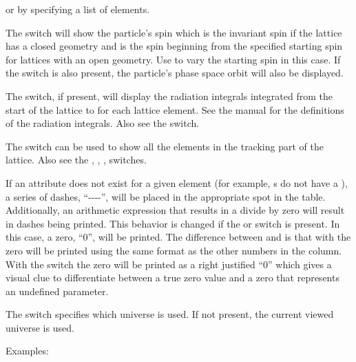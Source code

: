 {{{{{{{{\begin{description}
or by specifying a list  of elements. 
%
\item[-spin] \Newline
The  switch will show the particle's spin which is the invariant spin if the lattice has a
closed geometry and is the spin beginning from the specified starting spin for lattices with an open
geometry. Use  to vary the starting spin in this case. If the  switch
is also present, the particle's phase space orbit will also be displayed.
%
\item[-sum_radiation_integrals] \Newline
The  switch, if present, will display the radiation integrals
integrated from the start of the lattice to for each lattice element. See the \bmad manual for the
definitions of the radiation integrals. Also see the  switch.
%
\item[-tracking_elements] \Newline
The  switch can be used to show all the elements in the tracking part of the
lattice. Also see the , , ,  switches.
%
\item[-undef0] \Newline
If an attribute does not exist for a given element (for example, s do not have a
), a series of dashes, ``-{}-{}-{}-'', will be placed in the appropriate spot in the
table.  Additionally, an arithmetic expression that results in a divide by zero will result in
dashes being printed. This behavior is changed if the  or  switch is
present. In this case, a zero, ``0'', will be printed. The difference between  and
 is that with  the zero will be printed using the same format as the other
numbers in the column. With the  switch the zero will be printed as a right justified
``0'' which gives a visual clue to differentiate between a true zero value and a zero that
represents an undefined parameter.
%
\item[-universe <index>] \Newline
The  switch specifies which universe is used. If not present, the current viewed universe is
used.
\end{description}

Examples:

}}}}}}}}
